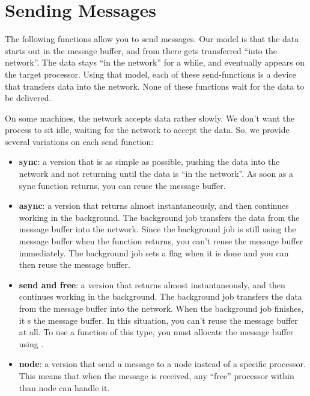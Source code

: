 
 

\section{Sending Messages}

The following functions allow you to send messages.  Our model is that
the data starts out in the message buffer, and from there gets
transferred ``into the network''.  The data stays ``in the network''
for a while, and eventually appears on the target processor.  Using
that model, each of these send-functions is a device that transfers
data into the network.  None of these functions wait for the data to
be delivered.

On some machines, the network accepts data rather slowly.  We don't
want the process to sit idle, waiting for the network to accept the
data.  So, we provide several variations on each send function:

\begin{itemize}

\item{{\bf sync}: a version that is as simple as possible, pushing the
data into the network and not returning until the data is ``in the
network''.  As soon as a sync function returns, you can reuse the
message buffer.}

\item{{\bf async}: a version that returns almost instantaneously, and then
continues working in the background.  The background job transfers the
data from the message buffer into the network.  Since the background job
is still using the message buffer when the function returns, you can't
reuse the message buffer immediately.  The background job sets a flag
when it is done and you can then reuse the message buffer.}

\item{{\bf send and free}: a version that returns almost instantaneously,
and then continues working in the background.  The background job
transfers the data from the message buffer into the network.  When the
background job finishes, it s the message buffer.  In
this situation, you can't reuse the message buffer at all. 
To use a function of this type, you must allocate the message buffer
using .}

\item{{\bf node}\experimental{}: a version that send a message to a node 
instead of a
specific processor. This means that when the message is received, any ``free''
processor within than node can handle it.}

\end{itemize}

